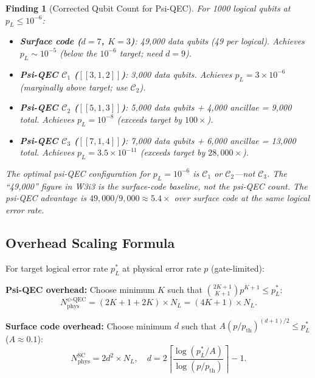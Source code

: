 \documentclass[11pt]{article}
\newtheorem{finding}[theorem]{Finding}
\theoremstyle{definition}
\theoremstyle{remark}
\begin{document}
\begin{finding}[Corrected Qubit Count for Psi-QEC]
\label{finding:qubit-count}
For 1000 logical qubits at $p_L \leq 10^{-6}$:
\begin{itemize}
  \item \textbf{Surface code ($d=7$, $K=3$)}: 49,000 data qubits (49 per logical).
    Achieves $p_L \sim 10^{-5}$ (below the $10^{-6}$ target; need $d=9$).
  \item \textbf{Psi-QEC $\mathcal{C}_1$ ($[[3,1,2]]$)}: 3,000 data qubits.
    Achieves $p_L = 3\times10^{-6}$ (marginally above target; use $\mathcal{C}_2$).
  \item \textbf{Psi-QEC $\mathcal{C}_2$ ($[[5,1,3]]$)}: 5,000 data qubits
    + 4,000 ancillae = 9,000 total.  Achieves $p_L = 10^{-8}$ (exceeds target
    by $100\times$).
  \item \textbf{Psi-QEC $\mathcal{C}_3$ ($[[7,1,4]]$)}: 7,000 data qubits
    + 6,000 ancillae = 13,000 total.  Achieves $p_L = 3.5\times10^{-11}$
    (exceeds target by $28,000\times$).
\end{itemize}
The optimal psi-QEC configuration for $p_L = 10^{-6}$ is $\mathcal{C}_1$ or
$\mathcal{C}_2$---not $\mathcal{C}_3$.  The ``49,000'' figure in W3i3 is the
surface-code baseline, not the psi-QEC count.  The psi-QEC advantage is
$49,000/9,000 \approx 5.4\times$ over surface code at the same logical error rate.
\end{finding}

\subsection{Overhead Scaling Formula}
\label{sec:overhead-scaling}

For target logical error rate $p_L^*$ at physical error rate $p$ (gate-limited):

\textbf{Psi-QEC overhead:} Choose minimum $K$ such that
$\binom{2K+1}{K+1}p^{K+1} \leq p_L^*$:
\begin{equation}
  N_{\mathrm{phys}}^{\psi\text{-QEC}} = (2K+1+2K)\times N_L = (4K+1)\times N_L.
  \label{eq:psi-overhead}
\end{equation}

\textbf{Surface code overhead:} Choose minimum $d$ such that
$A(p/p_{\mathrm{th}})^{(d+1)/2} \leq p_L^*$ ($A\approx0.1$):
\begin{equation}
  N_{\mathrm{phys}}^{\mathrm{SC}} = 2d^2\times N_L, \quad
  d = 2\left\lceil\frac{\log(p_L^*/A)}{\log(p/p_{\mathrm{th}})}\right\rceil - 1.
  \label{eq:sc-overhead}
\end{equation}
\end{document}

